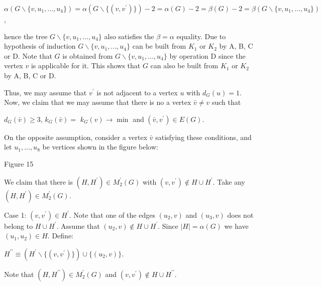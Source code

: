 \documentclass{article}
\begin{document}
\begin{center}
$\alpha (G\backslash \{v,u_{1},...,u_{4}\})=\alpha (G\backslash
\{(v,v^{\prime })\})-2=\alpha (G)-2=\beta (G)-2=\beta (G\backslash
\{v,u_{1},...,u_{4}\})$,
\end{center}

hence the tree $G\backslash \{v,u_{1},...,u_{4}\}$ also satisfies the $\beta
=\alpha $ equality. Due to hypothesis of induction $G\backslash
\{v,u_{1},...,u_{4}\}$ can be built from $K_{1}$ or $K_{2}$ by A, B, C or D.
Note that $G$ is obtained from $G\backslash \{v,u_{1},...,u_{4}\}$ by
operation D since the vertex $v$ is applicable for it. This shows that $G$
can also be built from $K_{1}$ or $K_{2}$ by A, B, C or D.

Thus, we may assume that $v^{\prime }$ is not adjacent to a vertex $u$ with $d_{G}(u)=1$. Now, we claim that we may assume that there is no a vertex $\bar{v}\neq v$ such that

\begin{center}
$d_{G}(\bar{v})\geq 3$, $k_{G}(\bar{v})=$ $k_{G}(v)\rightarrow \min $ and $(\bar{v},v^{\prime })\in E(G)$.
\end{center}

On the opposite assumption, consider a vertex $\bar{v}$ satisfying these
conditions, and let $u_{1},...,u_{8}$ be vertices shown in the figure below:

\begin{center}

Figure 15\bigskip
\end{center}

We claim that there is $(H,H^{\prime })\in M_{2}^{\prime }(G)$ with $(v,v^{\prime })\notin H\cup H^{\prime }$. Take any $(H,H^{\prime })\in
M_{2}^{\prime }(G)$.

Case 1: $(v,v^{\prime })\in H^{\prime }$. Note that one of the edges $(u_{2},v)$ and $(u_{3},v)$ does not belong to $H\cup H^{\prime }$. Assume
that $(u_{2},v)\notin H\cup H^{\prime }$. Since $\left\vert H\right\vert
=\alpha (G)$ we have $\left( u_{1},u_{2}\right) \in H$. Define:

\begin{center}
$H^{\prime \prime }\equiv (H^{\prime }\backslash \{(v,v^{\prime })\})\cup
\{(u_{2},v)\}$.
\end{center}

Note that $(H,H^{\prime \prime })\in M_{2}^{\prime }(G)$ and $(v,v^{\prime
})\notin H\cup H^{\prime \prime }$.
\end{document}
